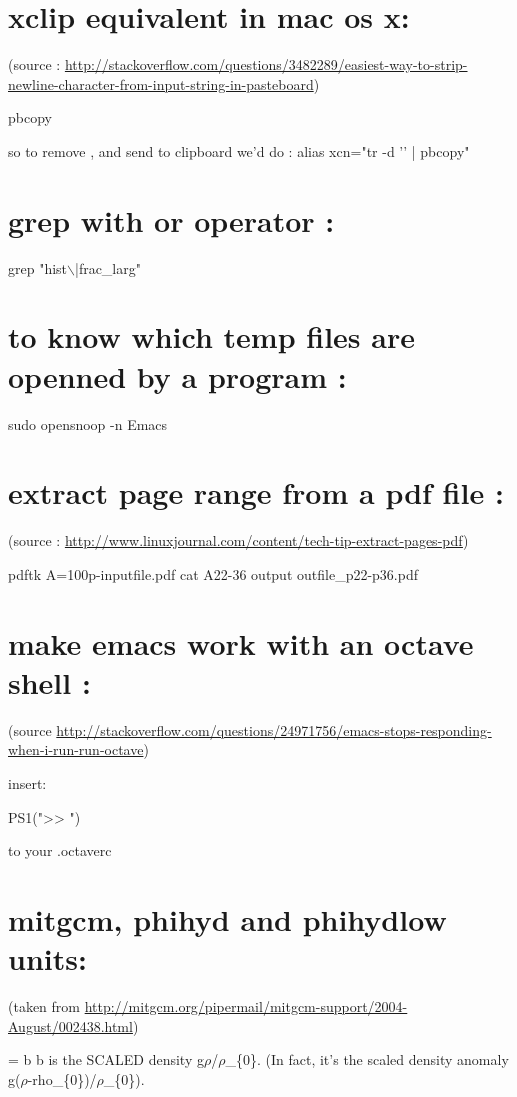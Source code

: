 \documentclass[11pt]{article}
\begin{document}
\section{xclip equivalent in mac os x:}
\label{sec-56}
(source : \url{http://stackoverflow.com/questions/3482289/easiest-way-to-strip-newline-character-from-input-string-in-pasteboard})

pbcopy

so to remove \n, and send to clipboard we'd do :
alias xcn="tr -d '\n' | pbcopy"
\section{grep with or operator :}
\label{sec-57}
grep  "hist$\backslash$|frac\_larg" 

\section{to know which temp files are openned by a program :}
\label{sec-58}

sudo opensnoop -n Emacs

\section{extract page range from a pdf file :}
\label{sec-59}
(source : \url{http://www.linuxjournal.com/content/tech-tip-extract-pages-pdf})

pdftk A=100p-inputfile.pdf cat A22-36 output outfile\_p22-p36.pdf

\section{make emacs work with an octave shell :}
\label{sec-60}
(source \url{http://stackoverflow.com/questions/24971756/emacs-stops-responding-when-i-run-run-octave})

insert:

PS1(">> ")

to your .octaverc
\section{mitgcm, phihyd and phihydlow units:}
\label{sec-61}

(taken from \url{http://mitgcm.org/pipermail/mitgcm-support/2004-August/002438.html})

 = b
b is the SCALED density g$\rho$/$\rho$\_\{0\}. (In fact, it's the scaled 
density anomaly g($\rho$-rho\_\{0\})/$\rho$\_\{0\}).  
\end{document}
